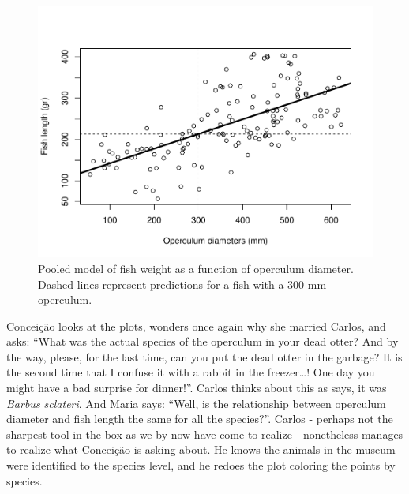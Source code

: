 \documentclass[
]{book}
\newenvironment{Shaded}{\begin{snugshade}}{\end{snugshade}}
\newcommand{\AttributeTok}[1]{\textcolor[rgb]{0.13,0.29,0.53}{#1}}
\newcommand{\CommentTok}[1]{\textcolor[rgb]{0.56,0.35,0.01}{\textit{#1}}}
\newcommand{\DecValTok}[1]{\textcolor[rgb]{0.00,0.00,0.81}{#1}}
\newcommand{\FunctionTok}[1]{\textcolor[rgb]{0.13,0.29,0.53}{\textbf{#1}}}
\newcommand{\NormalTok}[1]{#1}
\newcommand{\SpecialCharTok}[1]{\textcolor[rgb]{0.81,0.36,0.00}{\textbf{#1}}}
\newcommand{\StringTok}[1]{\textcolor[rgb]{0.31,0.60,0.02}{#1}}
\begin{document}
\begin{Shaded}
\end{Shaded}

\begin{figure}

{\centering \includegraphics[width=0.8\linewidth]{ECOMODbook_files/figure-latex/wod-1} 

}

\caption{Pooled model of fish weight as a function of operculum diameter. Dashed lines represent predictions for a fish with a 300 mm operculum.}\label{fig:wod}
\end{figure}

Conceição looks at the plots, wonders once again why she married Carlos, and asks: ``What was the actual species of the operculum in your dead otter? And by the way, please, for the last time, can you put the dead otter in the garbage? It is the second time that I confuse it with a rabbit in the freezer\ldots! One day you might have a bad surprise for dinner!''. Carlos thinks about this as says, it was \emph{Barbus sclateri}. And Maria says: ``Well, is the relationship between operculum diameter and fish length the same for all the species?''. Carlos - perhaps not the sharpest tool in the box as we by now have come to realize - nonetheless manages to realize what Conceição is asking about. He knows the animals in the museum were identified to the species level, and he redoes the plot coloring the points by species.
\end{document}
